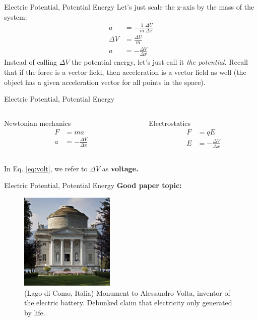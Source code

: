 \documentclass{beamer}
\begin{document}
\begin{frame}{Electric Potential, Potential Energy}
\small
Let's just scale the z-axis by the mass of the system:
\begin{align}
a &= -\frac{1}{m}\frac{\Delta U}{\Delta x} \\
\Delta V &= \frac{\Delta U}{m} \\
a &= -\frac{\Delta V}{\Delta x}
\end{align}
Instead of calling $\Delta V$ the potential energy, let's just call it \textit{the potential.}  Recall that if the force is a vector field, then acceleration is a vector field as well (the object has a given acceleration vector for all points in the space).
\end{frame}

\begin{frame}{Electric Potential, Potential Energy}
\begin{columns}[T]
\begin{column}{0.5\textwidth}
\alert{Newtonian mechanics} \\ \hrulefill
\begin{align}
F &= ma \\
a &= -\frac{\Delta V}{\Delta x}
\end{align}
\end{column}
\begin{column}{0.5\textwidth}
\alert{Electrostatics} \\ \hrulefill
\begin{align}
F &= qE \\
E &= -\frac{\Delta V}{\Delta x} \label{eq:volt}
\end{align}
\end{column}
\end{columns} \vspace{1cm}
In Eq. \ref{eq:volt}, we refer to $\Delta V$ as \textbf{voltage.}
\end{frame}

\begin{frame}{Electric Potential, Potential Energy}
\textbf{Good paper topic:}
\begin{figure}
\centering
\includegraphics[width=0.4\textwidth]{figures/volta.jpg}
\caption{\label{fig:volta} \small (Lago di Como, Italia) Monument to Alessandro Volta, inventor of the electric battery.  Debunked claim that electricity only generated by life.}
\end{figure}
\end{frame}
\end{document}
